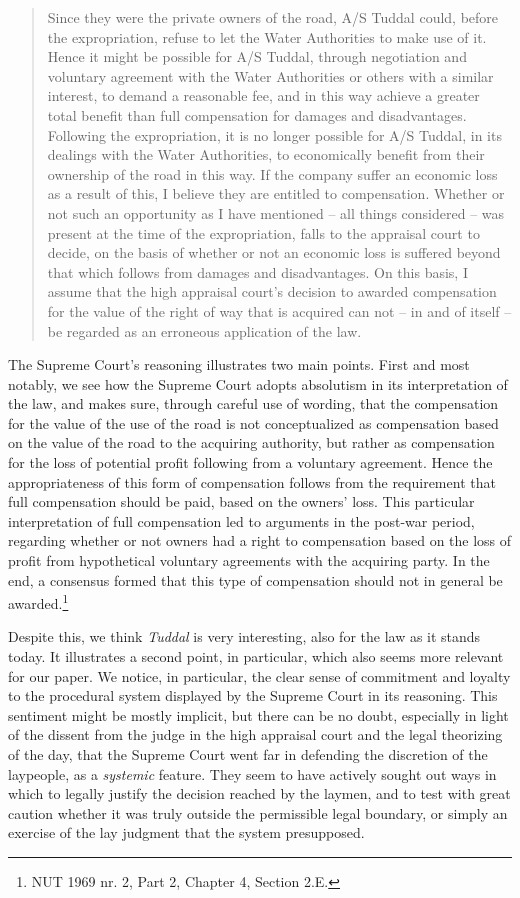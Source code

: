 \documentclass[10pt]{article} %
\begin{document}
\begin{quote}
Since they were the private owners of the road, A/S Tuddal could, before the expropriation, refuse to let the Water Authorities to make use of it. Hence it might be possible for A/S Tuddal, through negotiation and voluntary agreement with the Water Authorities or others with a similar interest, to demand a reasonable fee, and in this way achieve a greater total benefit than full compensation for damages and disadvantages. Following the expropriation, it is no longer possible for A/S Tuddal, in its dealings with the Water Authorities, to economically benefit from their ownership of the road in this way. If the company suffer an economic loss as a result of this, I believe they are entitled to compensation. Whether or not such an opportunity as I have mentioned -- all things considered -- was present at the time of the expropriation, falls to the appraisal court to decide, on the basis of whether or not an economic loss is suffered beyond that which follows from damages and disadvantages. On this basis, I assume that the high appraisal court's decision to awarded compensation for the value of the right of way that is acquired can not -- in and of itself -- be regarded as an erroneous application of the law.
\end{quote}

The Supreme Court's reasoning illustrates two main points. First and most notably, we see how the Supreme Court adopts absolutism in its interpretation of the law, and makes sure, through careful use of wording, that the compensation for the value of the use of the road is not conceptualized as compensation based on the value of the road to the acquiring authority, but rather as compensation for the loss of potential profit following from a voluntary agreement. Hence the appropriateness of this form of compensation follows from the requirement that full compensation should be paid, based on the owners' loss. This particular interpretation of full compensation led to arguments in the post-war period, regarding whether or not owners had a right to compensation based on the loss of profit from hypothetical voluntary agreements with the acquiring party. In the end, a consensus formed that this type of compensation should not in general be awarded.\footnote{NUT 1969 nr. 2, Part 2, Chapter 4, Section 2.E.}

Despite this, we think \emph{Tuddal} is very interesting, also for the law as it stands today. It illustrates a second point, in particular, which also seems more relevant for our paper. We notice, in particular, the clear sense of commitment and loyalty to the procedural system displayed by the Supreme Court in its reasoning. This sentiment might be mostly implicit, but there can be no doubt, especially in light of the dissent from the judge in the high appraisal court and the legal theorizing of the day, that the Supreme Court went far in defending the discretion of the laypeople, as a \emph{systemic} feature. They seem to have actively sought out ways in which to legally justify the decision reached by the laymen, and to test with great caution whether it was truly outside the permissible legal boundary, or simply an exercise of the lay judgment that the system presupposed. 
\end{document}
